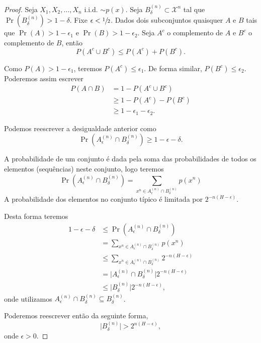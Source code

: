 \begin{proof}
Seja $X_1, X_2, \ldots, X_n$ i.i.d. $\sim p(x)$. Seja $B_{\delta}^{(n)} \subset \mathcal{X}^n$ tal que
$\Pr(B_{\delta}^{(n)}) > 1 - \delta$. Fixe $\epsilon < \sfrac{1}{2}$.
Dados dois subconjuntos quaisquer $A$ e $B$ tais que $\Pr(A) > 1 - \epsilon_1$ e $\Pr(B) > 1 - \epsilon_2$.
Seja $A^c$ o complemento de $A$ e $B^c$ o complemento de $B$, então
\begin{equation}
P(A^c \cup B^c) \leq P(A^c) + P(B^c) .
\end{equation}

Como $P(A) > 1 - \epsilon_1$, teremos $P(A^c) \leq \epsilon_1$. De forma similar, $P(B^c) \leq \epsilon_2$.
Poderemos assim escrever
\begin{subequations}
\begin{align}
P(A \cap B) &= 1 - P(A^c \cup B^c) \\
        &\geq 1 - P(A^c) - P(B^c) \\
        &\geq 1 - \epsilon_1 - \epsilon_2.
\end{align}
\end{subequations}

Podemos reescrever a desigualdade anterior como
\begin{equation}
\Pr(A_{\epsilon}^{(n)} \cap B_{\delta}^{(n)}) \geq 1 - \epsilon - \delta .
\end{equation}

A probabilidade de um conjunto é dada pela soma das probabilidades de todos os elementos (sequências) neste conjunto, logo teremos
\begin{equation}
\Pr(A_{\epsilon}^{(n)} \cap B_{\delta}^{(n)}) = \sum_{x^n \in A_{\epsilon}^{(n)} \cap B_{\delta}^{(n)}} p(x^n)
\end{equation}
A probabilidade dos elementos no conjunto típico é limitada por $2^{-n(H-\epsilon)}$.

Desta forma teremos
\begin{subequations}
\begin{align}
 1 - \epsilon - \delta &\leq \Pr(A_{\epsilon}^{(n)} \cap B_{\delta}^{(n)}) \\
                &= \sum_{x^n \in A_{\epsilon}^{(n)} \cap B_{\delta}^{(n)}} p(x^n) \\
                &\leq \sum_{x^n \in A_{\epsilon}^{(n)} \cap B_{\delta}^{(n)}} 2^{-n(H-\epsilon)} \\
                &= \vert A_{\epsilon}^{(n)} \cap B_{\delta}^{(n)} \vert 2^{-n(H-\epsilon)} \\
                &\leq \vert B_{\delta}^{(n)} \vert 2^{-n(H-\epsilon)},
\end{align}
\end{subequations}
onde utilizamos $A_{\epsilon}^{(n)} \cap B_{\delta}^{(n)} \subseteq B_{\delta}^{(n)}$.

Poderemos reescrever então da seguinte forma,
\begin{equation}
\vert B_{\delta}^{(n)} \vert  >  2^{n(H-\epsilon)} ,
\end{equation}
onde $\epsilon > 0$.
\end{proof}

